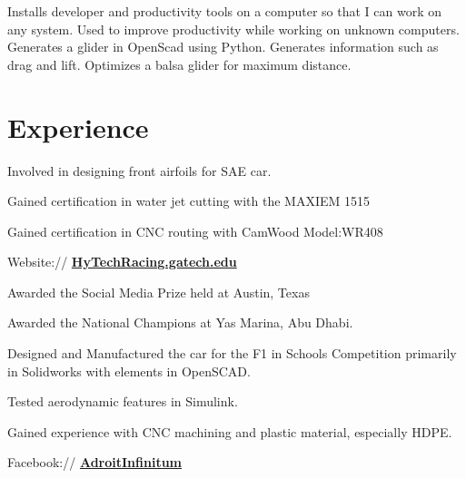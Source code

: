 \documentclass[a4paper]{deedy-resume}
\begin{document}
\begin{minipage}[t]{0.35\textwidth}
  \href{https://github.com/vishakhkumar/autoScript}{}  Installs developer and productivity tools on a computer so that I can work on any system. Used to improve productivity while working on unknown computers. \\
  
 \href{https://github.com/vishakhkumar/AE1600glider}{}  Generates a glider in OpenScad using Python. Generates information such as drag and lift.
Optimizes a balsa glider for maximum distance. \\

\sectionspace 

\end{minipage} 
\hspace*{.04\textwidth}
\begin{minipage}[t]{0.58\textwidth} 

\section{Experience}

\vspace{\topsep} 
\begin{tightitemize}
\item Involved in designing front airfoils for SAE car.
\item Gained certification in water jet cutting with the MAXIEM 1515 
\item Gained certification in CNC routing with CamWood Model:WR408 \\
\item Website:// \href{https://hytechracing.gatech.edu/}{\bf HyTechRacing.gatech.edu}
\end{tightitemize}
\sectionspace 

\vspace{\topsep} 
\begin{tightitemize}
\item Awarded the Social Media Prize held at Austin, Texas
\item Awarded the National Champions at Yas Marina, Abu Dhabi.
\item Designed and Manufactured the car for the F1 in Schools Competition primarily in Solidworks with elements in OpenSCAD.
\item Tested aerodynamic features in Simulink. 
\item Gained experience with CNC machining and plastic material, especially HDPE. \\
\item Facebook:// \href{https://www.facebook.com/AdroitInfinitum}{\bf AdroitInfinitum}
\end{tightitemize}
\sectionspace 


\end{minipage}
\end{document}
